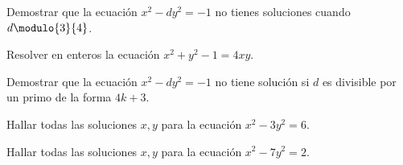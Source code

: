 \begin{exercise}
    Demostrar que la ecuación $x^2 - dy^2 = -1$ no tienes soluciones cuando $d \modulo{3}{4}$.
\end{exercise}

\begin{problem}
    Resolver en enteros la ecuación $x^2 + y^2 - 1 = 4xy$.
\end{problem}

\begin{problem}
    Demostrar que la ecuación $x^2 - dy^2 = -1$ no tiene solución si $d$ es divisible por un primo de la forma $4k + 3$.
\end{problem}

\begin{problem}
    Hallar todas las soluciones $x,y$ para la ecuación $x^2 - 3y^2 = 6$.
\end{problem}

\begin{problem}
    Hallar todas las soluciones $x,y$ para la ecuación $x^2 - 7y^2 = 2$.
\end{problem}